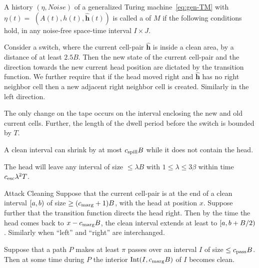 \documentclass[11pt]{memoir}
\theoremstyle{definition} %
\renewcommand{\le}{\leq}
\renewcommand{\ge}{\geq}
\renewcommand{\vek}[1]{\mathbf{#1}}
\def\B{B}
\newcommand{\h}{h} %
\newcommand{\vhc}{\vek{\hat h}}
\newcommand{\Int}{\mathrm{Int}} %
\newcommand{\Noise}{\mathit{Noise}}
\newcommand{\passno}{\pi}
\newcommand{\Tu}{T}
\newcommand{\cns}[1]{c_{\textrm{\upshape #1}}}
\newcommand{\CEsc}{\cns{esc}}
\newcommand{\CMarg}{\cns{marg}}
\newcommand{\CPass}{\cns{pass}}
\newcommand{\CSpill}{\cns{spill}}
\begin{document}
  \begin{definition}[Trajectory]\label{def:traj}
\begin{sloppypar}
   A history  \( (\eta, \Noise) \) of a generalized Turing 
machine~\eqref{eq:gen-TM} with \(\eta(t) =\)
\( (A(t), \h(t), \vhc(t)) \)
is called a  of \( M \) if the following conditions hold, in any 
noise-free space-time interval \( I\times J \).
  \end{sloppypar}
\begin{description}

\item[Transition Function]\label{i:def.traj.transition}
Consider a switch, where the current cell-pair \( \vhc \)
is inside a clean area, by a distance of at least \( 2.5\B \).
Then the new state of the current cell-pair and
the direction towards the new current head position
are dictated by the transition function.
We further require that if the head moved right and \( \vhc \) has no 
right neighbor cell then a new adjacent right neighbor cell is created.
Similarly in the left direction.

The only change on the tape occurs on the interval enclosing the new and old current cells.
Further, the length of the dwell period before the switch is bounded by \( \Tu \).

\item[Spill Bound]\label{i:spill-bound}
  A clean interval can shrink by at most \( \CSpill \B \) while it does not contain the head.

\item[Escape] \label{i:def.traj.escape}
  The head will leave any interval of size \( \le \lambda\B \) with \( 1\le\lambda\le 3\beta \)
  within time \( \CEsc\lambda^{2}\Tu \).

\begin{sloppypar}
\item[Attack Cleaning] \label{i:def.traj.attack-cleaning}
Suppose that the current cell-pair is at the end of a clean interval \( \left[a,b\right) \) of size
\( \ge (\CMarg+1)\B \), with the head at position \( x \).
Suppose further that the transition function directs the head right.
Then by the time the head comes back to \( x-\CMarg \B \), the clean interval 
extends at least to \( \lint{a}{b+\B/2} \).
Similarly when ``left'' and ``right'' are interchanged.
 \end{sloppypar}

\item[Pass Cleaning]
    Suppose that a path \( P \) makes at least \( \passno \) passes over an interval \( I \)
  of size \( \le\CPass\B \).
  Then at some time during \( P \) the interior \( \Int(I, \CMarg\B) \) of \( I \) becomes clean.

\end{description}
\end{definition}
\end{document}
